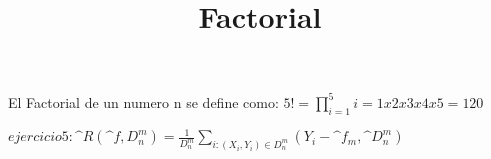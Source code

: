\documentclass[a4paper]{article}
\title{Factorial}
\begin{document}
	\maketitle
El Factorial de un numero n se define como: $5! = \prod_{i=1}^{5} i = 1x2x3x4x5 = 120$


$ejercicio 5: \^{R}(\^{f},D^{m}_{n}) = \frac{1}{D^{m}_{n}} \sum_{i:(X_{i},Y_{i}) \in D_{n}^{m}}(Y_{i}- \^{f}_{m},\^{D}_{n}^{m}) $
\end{document}

